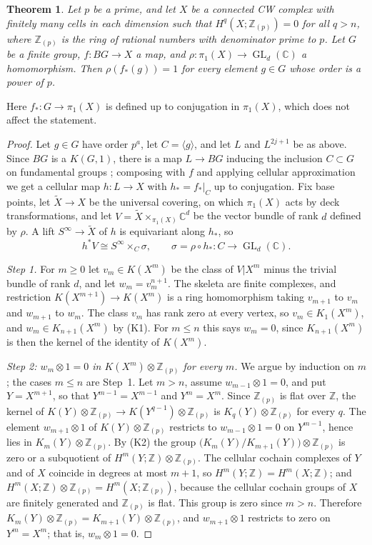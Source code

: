 \documentclass[11pt,a4paper]{article}
\newtheorem{theorem}{Theorem}[section]
\theoremstyle{definition}
\newcommand{\Z}{\mathbb{Z}}
\newcommand{\CC}{\mathbb{C}}
\newcommand{\Zp}{\Z_{(p)}}
\newcommand{\GL}{\operatorname{GL}}
\newcommand{\sk}[2]{#1^{#2}}
\begin{document}
\begin{theorem}\label{thm:K}
Let $p$ be a prime, and let $X$ be a connected CW complex with finitely many
cells in each dimension such that $H^q(X;\Zp)=0$ for all $q>n$, where $\Zp$
is the ring of rational numbers with denominator prime to $p$. Let $G$ be a
finite group, $f\colon BG\to X$ a map, and
$\rho\colon\pi_1(X)\to\GL_d(\CC)$ a homomorphism. Then $\rho(f_*(g))=1$ for
every element $g\in G$ whose order is a power of $p$.
\end{theorem}

Here $f_*\colon G\to\pi_1(X)$ is defined up to conjugation in $\pi_1(X)$,
which does not affect the statement.

\begin{proof}
Let $g\in G$ have order $p^a$, let $C=\langle g\rangle$, and let $L$ and
$\sk{L}{2j+1}$ be as above. Since $BG$ is a $K(G,1)$, there is a map
$L\to BG$ inducing the inclusion $C\subset G$ on fundamental groups
\cite[Proposition~1B.9]{Ha}; composing with $f$ and applying cellular
approximation we get a cellular map $h\colon L\to X$ with $h_*=f_*|_C$ up to
conjugation. Fix base points, let $\widetilde X\to X$ be the universal
covering, on which $\pi_1(X)$ acts by deck transformations, and let
$V=\widetilde X\times_{\pi_1(X)}\CC^d$ be the vector bundle of rank $d$
defined by $\rho$. A lift $S^\infty\to\widetilde X$ of $h$ is equivariant
along $h_*$, so
\begin{equation}\label{eq:pullback}
 h^*V\cong S^\infty\times_C\sigma,\qquad\sigma=\rho\circ h_*\colon C\to\GL_d(\CC).
\end{equation}

\emph{Step 1.} For $m\ge0$ let $v_m\in K(\sk{X}{m})$ be the class of
$V|\sk{X}{m}$ minus the trivial bundle of rank $d$, and let $w_m=v_m^{n+1}$.
The skeleta are finite complexes, and restriction
$K(\sk{X}{m+1})\to K(\sk{X}{m})$ is a ring homomorphism taking $v_{m+1}$ to
$v_m$ and $w_{m+1}$ to $w_m$. The class $v_m$ has rank zero at every vertex,
so $v_m\in K_1(\sk{X}{m})$, and $w_m\in K_{n+1}(\sk{X}{m})$ by (K1). For
$m\le n$ this says $w_m=0$, since $K_{n+1}(\sk{X}{m})$ is then the kernel of
the identity of $K(\sk{X}{m})$.

\emph{Step 2: $w_m\otimes1=0$ in $K(\sk{X}{m})\otimes\Zp$ for every $m$.} We
argue by induction on $m$; the cases $m\le n$ are Step~1. Let $m>n$, assume
$w_{m-1}\otimes1=0$, and put $Y=\sk{X}{m+1}$, so that
$\sk{Y}{m-1}=\sk{X}{m-1}$ and $\sk{Y}{m}=\sk{X}{m}$. Since $\Zp$ is flat
over $\Z$, the kernel of $K(Y)\otimes\Zp\to K(\sk{Y}{q-1})\otimes\Zp$ is
$K_q(Y)\otimes\Zp$ for every $q$. The element $w_{m+1}\otimes1$ of
$K(Y)\otimes\Zp$ restricts to $w_{m-1}\otimes1=0$ on $\sk{Y}{m-1}$, hence
lies in $K_m(Y)\otimes\Zp$. By (K2) the group
$\bigl(K_m(Y)/K_{m+1}(Y)\bigr)\otimes\Zp$ is zero or a subquotient of
$H^m(Y;\Z)\otimes\Zp$. The cellular cochain complexes of $Y$ and of $X$
coincide in degrees at most $m+1$, so $H^m(Y;\Z)=H^m(X;\Z)$; and
$H^m(X;\Z)\otimes\Zp=H^m(X;\Zp)$, because the cellular cochain groups of $X$
are finitely generated and $\Zp$ is flat. This group is zero since $m>n$.
Therefore $K_m(Y)\otimes\Zp=K_{m+1}(Y)\otimes\Zp$, and $w_{m+1}\otimes1$
restricts to zero on $\sk{Y}{m}=\sk{X}{m}$; that is, $w_m\otimes1=0$.


\end{proof}
\end{document}
